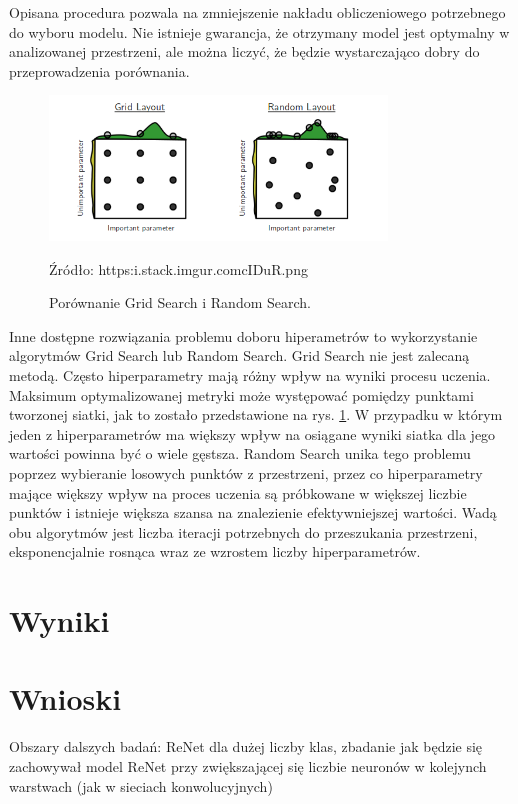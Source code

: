 \documentclass[oneside, mag]{mgr}
\begin{document}
Opisana procedura pozwala na zmniejszenie nakładu obliczeniowego potrzebnego do wyboru modelu. Nie istnieje gwarancja, że otrzymany model jest optymalny w analizowanej przestrzeni, ale można liczyć, że będzie wystarczająco dobry do przeprowadzenia porównania.

\begin{figure}
\centering
	\includegraphics[width=0.8\textwidth]{img/grid_search.png}
	\caption{Porównanie Grid Search i Random Search.} Źródło: https:\/\/i.stack.imgur.com\/cIDuR.png
	\label{fig:hyperparams}
\end{figure}

Inne dostępne rozwiązania problemu doboru hiperametrów to wykorzystanie algorytmów Grid Search lub Random Search. Grid Search nie jest zalecaną metodą. Często hiperparametry mają różny wpływ na wyniki procesu uczenia. Maksimum optymalizowanej metryki może występować pomiędzy punktami tworzonej siatki, jak to zostało przedstawione na rys. \ref{fig:hyperparams}. W przypadku w którym jeden z hiperparametrów ma większy wpływ na osiągane wyniki siatka dla jego wartości powinna być o wiele gęstsza. Random Search unika tego problemu poprzez wybieranie losowych punktów z przestrzeni, przez co hiperparametry mające większy wpływ na proces uczenia są próbkowane w większej liczbie punktów i istnieje większa szansa na znalezienie efektywniejszej wartości. Wadą obu algorytmów jest liczba iteracji potrzebnych do przeszukania przestrzeni, eksponencjalnie rosnąca wraz ze wzrostem liczby hiperparametrów.


\chapter{Wyniki}


\chapter{Wnioski}

Obszary dalszych badań:
ReNet dla dużej liczby klas,
zbadanie jak będzie się zachowywał model ReNet przy zwiększającej się liczbie neuronów w kolejynch warstwach (jak w sieciach konwolucyjnych)



\listoffigures
\end{document}
